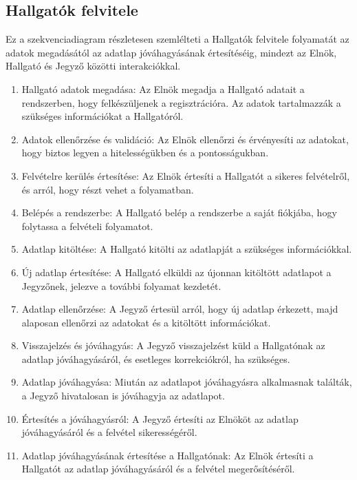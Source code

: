 \documentclass[a4paper,12pt]{article}
\begin{document}
\subsection{Hallgatók felvitele}

Ez a szekvenciadiagram részletesen szemlélteti a Hallgatók felvitele folyamatát az adatok megadásától az adatlap jóváhagyásának értesítéséig, mindezt az Elnök, Hallgató és Jegyző közötti interakciókkal.

\begin{enumerate}
\item Hallgató adatok megadása: Az Elnök megadja a Hallgató adatait a rendszerben, hogy felkészüljenek a regisztrációra. Az adatok tartalmazzák a szükséges információkat a Hallgatóról.

\item Adatok ellenőrzése és validáció: Az Elnök ellenőrzi és érvényesíti az adatokat, hogy biztos legyen a hitelességükben és a pontosságukban.

\item Felvételre kerülés értesítése: Az Elnök értesíti a Hallgatót a sikeres felvételről, és arról, hogy részt vehet a folyamatban.

\item Belépés a rendszerbe: A Hallgató belép a rendszerbe a saját fiókjába, hogy folytassa a felvételi folyamatot.

\item Adatlap kitöltése: A Hallgató kitölti az adatlapját a szükséges információkkal.

\item Új adatlap értesítése: A Hallgató elküldi az újonnan kitöltött adatlapot a Jegyzőnek, jelezve a további folyamat kezdetét.

\item Adatlap ellenőrzése: A Jegyző értesül arról, hogy új adatlap érkezett, majd alaposan ellenőrzi az adatokat és a kitöltött információkat.

\item Visszajelzés és jóváhagyás: A Jegyző visszajelzést küld a Hallgatónak az adatlap jóváhagyásáról, és esetleges korrekciókról, ha szükséges.

\item Adatlap jóváhagyása: Miután az adatlapot jóváhagyásra alkalmasnak találták, a Jegyző hivatalosan is jóváhagyja az adatlapot.

\item Értesítés a jóváhagyásról: A Jegyző értesíti az Elnököt az adatlap jóváhagyásáról és a felvétel sikerességéről.

\item Adatlap jóváhagyásának értesítése a Hallgatónak: Az Elnök értesíti a Hallgatót az adatlap jóváhagyásáról és a felvétel megerősítéséről.
\end{enumerate}
\end{document}
